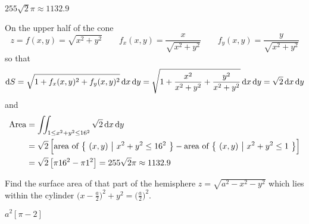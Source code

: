 %

\begin{answer}
$255\sqrt{2}\pi\approx 1132.9$
\end{answer}

\begin{solution}
On the upper half of the cone 
\begin{equation*}
z=f(x,y)=\sqrt{x^2+y^2}\qquad 
f_x(x,y)=\frac{x}{\sqrt{x^2+y^2}}\qquad
f_y(x,y)=\frac{y}{\sqrt{x^2+y^2}}
\end{equation*}
so that
\begin{equation*}
\mathrm{d}S=\sqrt{1+f_x(x,y)^2+f_y(x,y)^2}\,\mathrm{d}x\,\mathrm{d}y
=\sqrt{1+\frac{x^2}{x^2+y^2}+\frac{y^2}{x^2+y^2}}\,\mathrm{d}x\,\mathrm{d}y
=\sqrt{2}\,\mathrm{d}x\,\mathrm{d}y
\end{equation*}
and
\begin{align*}
\text{Area}&= \iint_{1\le x^2+y^2\le 16^2}\sqrt{2}\,\mathrm{d}x\,\mathrm{d}y \\
&=\sqrt{2}\,\Big[\text{area of }\big\{ \ (x,y)\ \big|\ x^2+y^2\le 16^2\ \big\}-
           \text{area of }\big\{ \ (x,y)\ \big|\ x^2+y^2\le 1\ \big\}\Big] \\
&=\sqrt{2}\,\big[\pi 16^2-\pi 1^2\big]
=255\sqrt{2}\pi\approx 1132.9
\end{align*}
\end{solution}

\begin{question} [M200 2001D] %
Find the surface area of that part of the hemisphere 
$z=\sqrt{a^2-x^2-y^2}$ which lies within the cylinder $\big(x-\frac{a}{2}\big)^2+y^2=\big(\frac{a}{2}\big)^2$.
\end{question}

%

\begin{answer}
$a^2[\pi-2]$
\end{answer}

